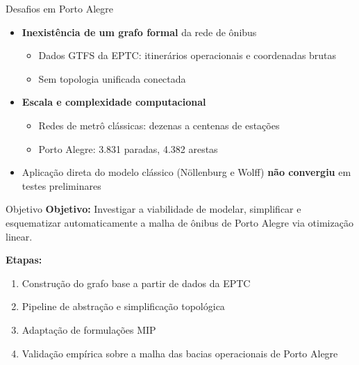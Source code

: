 \documentclass{beamer}
\begin{document}
\begin{frame}{Desafios em Porto Alegre}
  \begin{itemize}
    \item \textbf{Inexistência de um grafo formal} da rede de ônibus
      \begin{itemize}
        \item Dados GTFS da EPTC: itinerários operacionais e coordenadas brutas
        \item Sem topologia unificada conectada
      \end{itemize}
    \item \textbf{Escala e complexidade computacional}
      \begin{itemize}
        \item Redes de metrô clássicas: dezenas a centenas de estações
        \item Porto Alegre: 3.831 paradas, 4.382 arestas
      \end{itemize}
    \item Aplicação direta do modelo clássico (Nöllenburg e Wolff) \textbf{não convergiu} em testes preliminares
  \end{itemize}
\end{frame}

\begin{frame}{Objetivo}
  \textbf{Objetivo:} Investigar a viabilidade de modelar, simplificar e esquematizar automaticamente a malha de ônibus de Porto Alegre via otimização linear.

  \vspace{0.3cm}
  \textbf{Etapas:}
  \begin{enumerate}
    \item Construção do grafo base a partir de dados da EPTC
    \item Pipeline de abstração e simplificação topológica
    \item Adaptação de formulações MIP
    \item Validação empírica sobre a malha das bacias operacionais de Porto Alegre
  \end{enumerate}
\end{frame}

\end{document}
